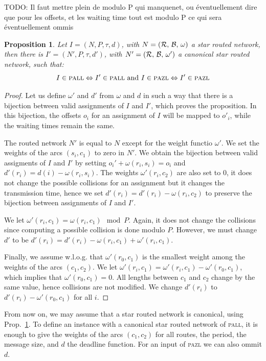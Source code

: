 \documentclass[a4paper,10pt]{article}
\newtheorem{proposition}{Proposition}
\newcommand{\todo}[1]{{\color{red} TODO: {#1}}}
\newcommand\pazl{\textsc{pazl}\xspace}
\newcommand\pall{\textsc{pall}\xspace}
\begin{document}
\todo{Il faut mettre plein de modulo P qui manquenet, ou éventuellement dire
que pour les offsets, et les waiting time tout est modulo P ce qui sera éventuellement ommis }


  \begin{proposition}\label{prop:canonical}
   Let $I = (N, P, \tau , d)$, with $N = (\cal{R},\,\cal{B},\,\omega)$ a star routed network, then there is 
   $I' = (N', P, \tau , d')$, with  $N' = (\cal{R},\,\cal{B},\,\omega')$ a canonical star routed network, such that:
     $$I \in \pall \Leftrightarrow I' \in \pall \text{ and } I \in \pazl \Leftrightarrow I' \in \pazl$$
  \end{proposition}

  \begin{proof}
  Let us define $\omega'$ and $d'$ from $\omega$ and $d$ in such a way that there is a bijection 
   between valid assignments of $I$ and $I'$, which proves the proposition. In this bijection,
   the offsets $o_i$ for an assignment of $I$ will be mapped to $o'_i$, while the waiting times remain the same.
  
  The routed network $N'$ is equal to $N$ except for the weight functio $\omega'$.
  We set the weights of the arcs $(s_i,c_1)$ to zero in $N'$. We obtain the bijection between valid assigments of $I$ and $I'$ by setting $o_i' + \omega(r_i,s_i) = o_i $ and $d'(r_i) = d(i) - \omega(r_i,s_i)$. The weights $\omega'(r_i,c_2)$ are also set to $0$, it does not change the possible collisions
  for an assignment but it changes the transmission time, hence we set $d'(r_i) = d'(r_i) - \omega(r_i,c_2)$
  to preserve the bijection between assignments of $I$ and $I'$. 

  We let $\omega'(r_i,c_1) = \omega(r_i,c_1) \mod P$. Again, it does not change the collisions since computing a possible collision is done modulo $P$. However, we must change $d'$ to be $d'(r_i) = d'(r_i) - \omega(r_i,c_1) + \omega'(r_i,c_1)$.

  Finally, we assume w.l.o.g. that $\omega'(r_0,c_1)$ is the smallest weight among the weights of the arcs
  $(c_1,c_2)$. We let $\omega'(r_i,c_1) = \omega'(r_i,c_1) - \omega'(r_0,c_1)$, which implies that $\omega'(r_0,c_1) = 0$.  All lengths between $c_1$ and $c_2$ change by the same value, hence collisions are not modified. We change $d'(r_i)$ to  $d'(r_i) - \omega'(r_0,c_1)$ for all $i$.
  \end{proof}

   From now on, we may assume that a star routed network is canonical, using Prop.~\ref{prop:canonical}. To define an instance with a canonical star routed network of \pall, it is enough to give the weights of the arcs $(c_1,c_2)$ for all routes, the period, the message size, and $d$ the deadline function. For an input of \pazl we can also ommit $d$.
\end{document}
